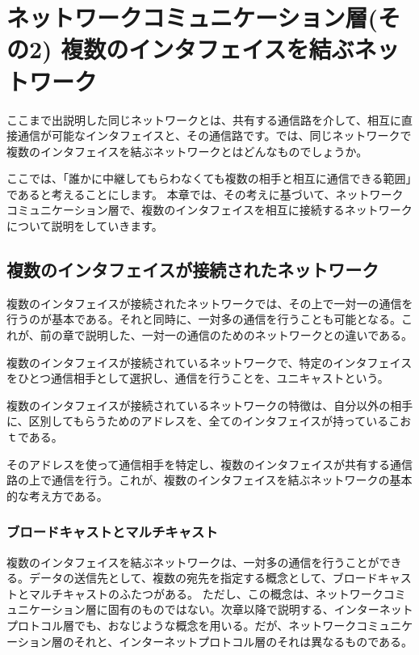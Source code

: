 \chapter{ネットワークコミュニケーション層(その2) 複数のインタフェイスを結ぶネットワーク}



ここまで出説明した同じネットワークとは、共有する通信路を介して、相互に直接通信が可能なインタフェイスと、その通信路です。では、同じネットワークで複数のインタフェイスを結ぶネットワークとはどんなものでしょうか。

ここでは、「誰かに中継してもらわなくても複数の相手と相互に通信できる範囲」であると考えることにします。
本章では、その考えに基づいて、ネットワークコミュニケーション層で、複数のインタフェイスを相互に接続するネットワークについて説明をしていきます。

\section{複数のインタフェイスが接続されたネットワーク}

複数のインタフェイスが接続されたネットワークでは、その上で一対一の通信を行うのが基本である。それと同時に、一対多の通信を行うことも可能となる。これが、前の章で説明した、一対一の通信のためのネットワークとの違いである。

複数のインタフェイスが接続されているネットワークで、特定のインタフェイスをひとつ通信相手として選択し、通信を行うことを、ユニキャストという。

複数のインタフェイスが接続されているネットワークの特徴は、自分以外の相手に、区別してもらうためのアドレスを、全てのインタフェイスが持っているこおｔである。

そのアドレスを使って通信相手を特定し、複数のインタフェイスが共有する通信路の上で通信を行う。これが、複数のインタフェイスを結ぶネットワークの基本的な考え方である。


\subsection{ブロードキャストとマルチキャスト}
複数のインタフェイスを結ぶネットワークは、一対多の通信を行うことができる。データの送信先として、複数の宛先を指定する概念として、ブロードキャストとマルチキャストのふたつがある。
ただし、この概念は、ネットワークコミュニケーション層に固有のものではない。次章以降で説明する、インターネットプロトコル層でも、おなじような概念を用いる。だが、ネットワークコミュニケーション層のそれと、インターネットプロトコル層のそれは異なるものである。

